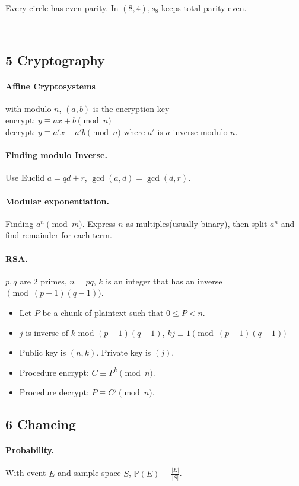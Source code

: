\documentclass[11pt,twocolumn]{scrartcl}
\begin{document}
Every circle has even parity. In $(8,4), s_8$ keeps total parity even.

\hfill\\
\subsection*{5 Cryptography}
\paragraph{Affine Cryptosystems} with modulo $n$, $(a,b)$ is the encryption key\\
encrypt: $y \equiv ax + b \pmod{n}$\\
decrypt: $y \equiv a'x - a'b \pmod{n}$ where $a'$ is $a$ inverse modulo $n$.

\paragraph{Finding modulo Inverse.} Use Euclid $a = qd + r$, $\gcd(a,d) = \gcd(d,r)$.

\paragraph{Modular exponentiation.} Finding $a^n \pmod{m}$.
Express $n$ as multiples(usually binary), then split $a^n$ and find remainder for each term.

\newpage
\paragraph{RSA.}
$p,q$ are $2$ primes, $n = pq$, $k$ is an integer that has an inverse $\pmod{(p-1)(q-1)}$.
\begin{itemize}
    \item Let $P$ be a chunk of plaintext such that $0\leq P < n$.
    \item $j$ is inverse of $k$ mod $(p-1)(q-1)$, $kj \equiv 1 \pmod{(p-1)(q-1)}$
    \item Public key is $(n,k)$. Private key is $(j)$.
    \item Procedure encrypt: $C \equiv P^k \pmod{n}$.
    \item Procedure decrypt: $P \equiv C^j \pmod{n}$.
\end{itemize}

\subsection*{6 Chancing}
\paragraph{Probability.}
With event $E$ and sample space $S$,
$\mathbb{P}(E) = \displaystyle\frac{|E|}{|S|}$.
\end{document}
